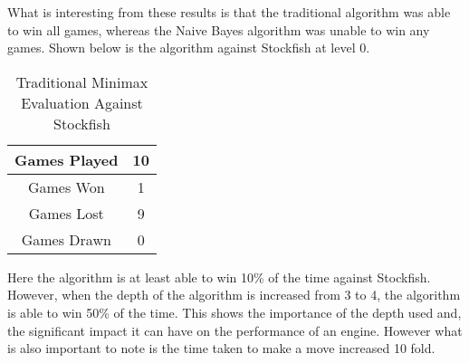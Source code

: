 
What is interesting from these results is that the traditional algorithm was able to win all games, whereas the Naive Bayes algorithm was unable to win any games. Shown below is the algorithm against Stockfish at level 0.

\begin{table}[H]
    \centering
    \begin{tabular}{|c|c|}
    \hline
    Games Played        & 10           \\ \hline
    Games Won           & 1           \\ \hline
    Games Lost          & 9          \\ \hline
    Games Drawn         & 0           \\ \hline
    \end{tabular}
    \caption{Traditional Minimax Evaluation Against Stockfish}
    \label{tab:traditional_minimax_evaluation_stockfish}
\end{table}

Here the algorithm is at least able to win 10\% of the time against Stockfish. However, when the depth of the algorithm is increased from 3 to 4, the algorithm is able to win 50\% of the time. This shows the importance of the depth used and, the significant impact it can have on the performance of an engine. However what is also important to note is the time taken to make a move increased 10 fold. 

